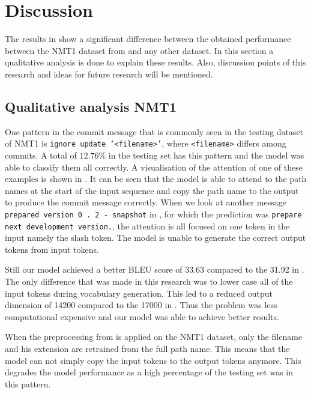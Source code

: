 \section{Discussion}\label{sec:discussion}
The results in  show a significant difference between the obtained performance between the NMT1 dataset from \cite{jiang_automatically_2017} and any other dataset. In this section a qualitative analysis is done to explain these results. Also, discussion points of this research and ideas for future research will be mentioned.

\subsection{Qualitative analysis NMT1}
One pattern in the commit message that is commonly seen in the testing dataset of NMT1 is \texttt{ignore update '<filename>'}, where \texttt{<filename>} differs among commits. A total of $12.76\%$ in the testing set has this pattern and the model was able to classify them all correctly. A visualisation of the attention of one of these examples is shown in . It can be seen that the model is able to attend to the path names at the start of the input sequence and copy the path name to the output to produce the commit message correctly. When we look at another message \texttt{prepared version 0 . 2 - snapshot} in , for which the prediction was \texttt{prepare next development version.}, the attention is all focused on one token in the input namely the slash token. The model is unable to generate the correct output tokens from input tokens.

Still our model achieved a better BLEU score of 33.63 compared to the 31.92 in \cite{jiang_automatically_2017}. The only difference that was made in this research was to lower case all of the input tokens during vocabulary generation. This led to a reduced output dimension of 14200 compared to the 17000 in \cite{jiang_automatically_2017}. Thus the problem was less computational expensive and our model was able to achieve better results.

When the preprocessing from  is applied on the NMT1 dataset, only the filename and his extension are retrained from the full path name. This means that the model can not simply copy the input tokens to the output tokens anymore. This degrades the model performance as a high percentage of the testing set was in this pattern.

